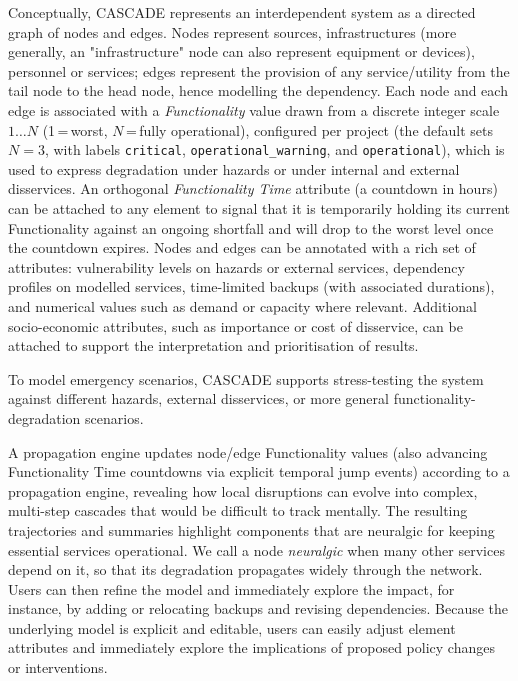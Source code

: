 \documentclass[review,12pt]{elsarticle}
\begin{document}
Conceptually, CASCADE represents an interdependent system as a directed graph
of nodes and edges. Nodes represent sources, infrastructures (more generally, an "infrastructure" node can also represent equipment or devices), personnel or services; edges represent the provision of any service/utility from the tail node to the head node, hence modelling the dependency.
Each node and each edge is associated with a \emph{Functionality} value drawn
from a discrete integer scale $1\ldots N$ (1\,=\,worst, $N$\,=\,fully
operational), configured per project (the default sets $N=3$, with labels
\texttt{critical}, \texttt{operational\_warning}, and \texttt{operational}),
which is used to express degradation under hazards or under internal and
external disservices. An orthogonal \emph{Functionality Time} attribute (a
countdown in hours) can be attached to any element to signal that it is
temporarily holding its current Functionality against an ongoing shortfall and will drop to the worst level once the countdown expires.
Nodes and edges can be annotated with a rich set of attributes: vulnerability levels on hazards or external services, dependency profiles on modelled services, time-limited backups (with associated durations), and numerical values such as demand or capacity where relevant. Additional socio-economic attributes, such as importance or cost of disservice, can be attached to support the interpretation and prioritisation of results.

To model emergency scenarios, CASCADE supports stress-testing the system against different hazards, external disservices, or more general functionality-degradation scenarios.

A propagation engine updates node/edge Functionality values (also advancing Functionality Time countdowns via explicit temporal jump events) according to a propagation engine, revealing how local disruptions can evolve into complex, multi-step cascades that would be difficult to track mentally. The resulting trajectories and summaries highlight components that are neuralgic for keeping essential services operational. We call a node \emph{neuralgic} when many other services depend on it, so that its degradation propagates widely through the network. Users can then refine the model and immediately explore the impact, for instance, by adding or relocating backups and revising dependencies. Because the underlying model is explicit and editable, users can easily adjust element attributes and immediately explore the implications of proposed policy changes or interventions.
\end{document}
